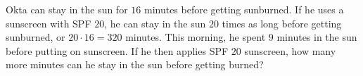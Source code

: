 Okta can stay in the sun for $16$ minutes before getting sunburned. If he uses a sunscreen with SPF $20$, he can stay in the sun $20$ times as long before getting sunburned, or $20\cdot16=320$ minutes. This morning, he spent $9$ minutes in the sun before putting on sunscreen. If he then applies SPF $20$ sunscreen, how many more minutes can he stay in the sun before getting burned?
